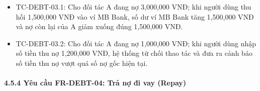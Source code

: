 \documentclass[11pt,a4paper]{article}
\providecommand{\tightlist}{
  \setlength{\itemsep}{0pt}\setlength{\parskip}{0pt}}
\begin{document}
\begin{itemize}
  \begin{itemize}
  \tightlist
  \item
    TC-DEBT-03.1: Cho đối tác A đang nợ 3,000,000 VNĐ; khi người dùng
    thu hồi 1,500,000 VNĐ vào ví MB Bank, số dư ví MB Bank tăng
    1,500,000 VNĐ và nợ còn lại của A giảm xuống đúng 1,500,000 VNĐ.
  \item
    TC-DEBT-03.2: Cho đối tác A đang nợ 1,000,000 VNĐ; khi người dùng
    nhập số tiền thu nợ 1,200,000 VNĐ, hệ thống từ chối thao tác và đưa
    ra cảnh báo số tiền thu nợ vượt quá số nợ gốc hiện tại.
  \end{itemize}
\end{itemize}

\newpage

\paragraph{4.5.4 Yêu cầu FR-DEBT-04: Trả nợ đi vay
(Repay)}\label{454-yuxeau-cux1ea7u-fr-debt-04-trux1ea3-nux1ee3-ux111i-vay-repay}
\end{document}

